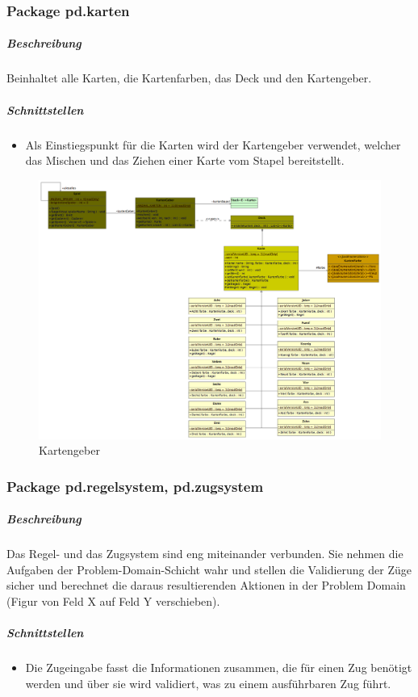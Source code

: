 \documentclass[12pt,halfparskip]{scrartcl}
\begin{document}
\subsubsection{Package pd.karten} %
\label{ssub:package_pd_karten}
\subparagraph{Beschreibung}
Beinhaltet alle Karten, die Kartenfarben, das Deck und den Kartengeber. 

\subparagraph{Schnittstellen} %
\label{ssub:schnittstellen}
\begin{itemize}
	\item Als Einstiegspunkt für die Karten wird der Kartengeber verwendet, welcher das Mischen und das Ziehen einer Karte vom Stapel bereitstellt.
\end{itemize}

\begin{figure}[h]
	\centering
	\includegraphics[width=0.8 \textwidth]{pd_kartengeber}
	\caption{Kartengeber}
	\label{fig:pd_kartengeber}
\end{figure}


\clearpage
\subsubsection{Package pd.regelsystem, pd.zugsystem} %
\label{ssub:package_pd_regelsystem}
\subparagraph{Beschreibung}
Das Regel- und das Zugsystem sind eng miteinander verbunden. Sie nehmen die Aufgaben der Problem-Domain-Schicht wahr und stellen die Validierung der Züge sicher und berechnet die daraus resultierenden Aktionen in der Problem Domain (Figur von Feld X auf Feld Y verschieben).

\subparagraph{Schnittstellen} %
\label{ssub:schnittstellen}
\begin{itemize}
	\item Die Zugeingabe fasst die Informationen zusammen, die für einen Zug benötigt werden und über sie wird validiert, was zu einem ausführbaren Zug führt.
\end{itemize}
\end{document}
